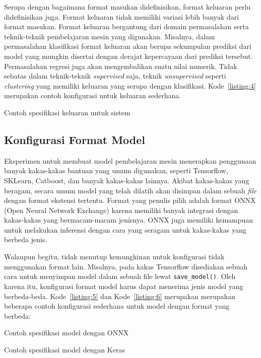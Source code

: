 Serupa dengan bagaimana format masukan didefinisikan, format keluaran perlu didefinisikan juga.
Format keluaran tidak memiliki variasi lebih banyak dari format masukan.
Format keluaran bergantung dari domain permasalahan serta teknik-teknik pembelajaran mesin yang digunakan.
Misalnya, dalam permasalahan klasifikasi format keluaran akan berupa sekumpulan prediksi dari model yang mungkin disertai dengan derajat kepercayaan dari prediksi tersebut.
Permasalahan regresi juga akan mengembalikan suatu nilai numerik.
Tidak sebatas dalam teknik-teknik \textit{supervised} saja, teknik \textit{unsupervised} seperti \textit{clustering} yang memiliki keluaran yang serupa dengan klasifikasi.
Kode~\ref{listing:4} merupakan contoh konfigurasi untuk keluaran sederhana.

\begin{code}
	\caption{Contoh spesifikasi keluaran untuk sistem}\label{listing:4}
\end{code}

\subsection{Konfigurasi Format Model}\label{section:03-model-format}

Eksperimen untuk membuat model pembelajaran mesin menerapkan penggunaan banyak kakas-kakas bantuan yang umum digunakan, seperti Tensorflow, SKLearn, Catboost, dan banyak kakas-kakas lainnya.
Akibat kakas-kakas yang beragam, secara umum model yang telah dilatih akan disimpan dalam sebuah \textit{file} dengan format ekstensi tertentu.
Format yang penulis pilih adalah format ONNX (Open Neural Network Exchange) karena memiliki banyak integrasi dengan kakas-kakas yang bermacam-macam jenisnya.
ONNX juga memiliki kemampuan untuk melakukan inferensi dengan cara yang seragam untuk kakas-kakas yang berbeda jenis.

Walaupun begitu, tidak menutup kemungkinan untuk konfigurasi tidak menggunakan format lain.
Misalnya, pada kakas Tensorflow disediakan sebuah cara untuk menyimpan model dalam sebuah file lewat \texttt{save_model()}.
Oleh karena itu, konfigurasi format model harus dapat menerima jenis model yang berbeda-beda.
Kode~\ref{listing:5} dan Kode~\ref{listing:6} merupakan merupakan beberapa contoh konfigurasi sederhana untuk model dengan format yang berbeda:

\begin{code}
	\caption{Contoh spesifikasi model dengan ONNX}\label{listing:5}
\end{code}
\begin{code}
	\caption{Contoh spesifikasi model dengan Keras}\label{listing:6}
\end{code}

